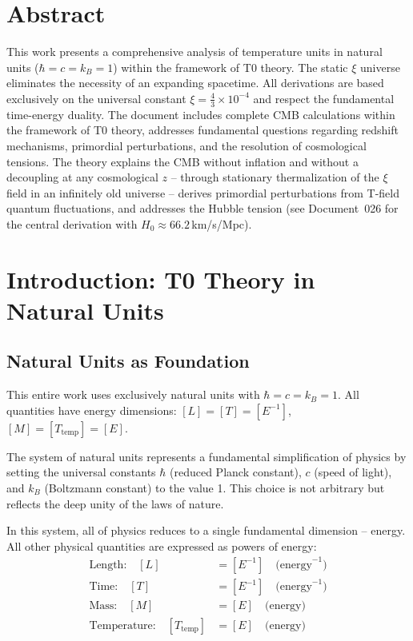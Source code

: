 \section*{Abstract}
		This work presents a comprehensive analysis of temperature units in natural units ($\hbar = c = k_B = 1$) within the framework of T0 theory. The static $\xi$ universe eliminates the necessity of an expanding spacetime. All derivations are based exclusively on the universal constant $\xi = \frac{4}{3} \times 10^{-4}$ and respect the fundamental time-energy duality. The document includes complete CMB calculations within the framework of T0 theory, addresses fundamental questions regarding redshift mechanisms, primordial perturbations, and the resolution of cosmological tensions. The theory explains the CMB without inflation and without a decoupling at any cosmological $z$ -- through stationary thermalization of the $\xi$ field in an infinitely old universe -- derives primordial perturbations from T-field quantum fluctuations, and addresses the Hubble tension (see Document~026 for the central derivation with $H_0 \approx 66.2\,$km/s/Mpc).

	
	
	\section{Introduction: T0 Theory in Natural Units}
	
	\subsection{Natural Units as Foundation}
	
	\begin{important}
		This entire work uses exclusively natural units with $\hbar = c = k_B = 1$. All quantities have energy dimensions: $[L] = [T] = [E^{-1}]$, $[M] = [T_{\text{temp}}] = [E]$.
	\end{important}
	
	The system of natural units represents a fundamental simplification of physics by setting the universal constants $\hbar$ (reduced Planck constant), $c$ (speed of light), and $k_B$ (Boltzmann constant) to the value 1. This choice is not arbitrary but reflects the deep unity of the laws of nature.
	
	In this system, all of physics reduces to a single fundamental dimension -- energy. All other physical quantities are expressed as powers of energy:
	\begin{align}
		\text{Length:} \quad [L] &= [E^{-1}] \quad \text{(energy}^{-1}\text{)} \\
		\text{Time:} \quad [T] &= [E^{-1}] \quad \text{(energy}^{-1}\text{)} \\
		\text{Mass:} \quad [M] &= [E] \quad \text{(energy)} \\
		\text{Temperature:} \quad [T_{\text{temp}}] &= [E] \quad \text{(energy)}
	\end{align}
	
